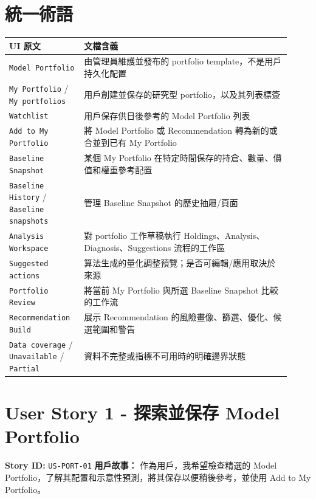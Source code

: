 \section{統一術語}
\begingroup
\small
\begin{longtable}{L{0.24\linewidth}L{0.68\linewidth}}
\toprule
\textbf{UI 原文} & \textbf{文檔含義} \\
\midrule
\texttt{Model Portfolio} & 由管理員維護並發布的 portfolio template，不是用戶持久化配置 \\
\texttt{My Portfolio} /\allowbreak{} \texttt{My portfolios} & 用戶創建並保存的研究型 portfolio，以及其列表標簽 \\
\texttt{Watchlist} & 用戶保存供日後參考的 Model Portfolio 列表 \\
\texttt{Add to My Portfolio} & 將 Model Portfolio 或 Recommendation 轉為新的或合並到已有 My Portfolio \\
\texttt{Baseline Snapshot} & 某個 My Portfolio 在特定時間保存的持倉、數量、價值和權重參考配置 \\
\texttt{Baseline History} /\allowbreak{} \texttt{Baseline snapshots} & 管理 Baseline Snapshot 的歷史抽屜/\allowbreak{}頁面 \\
\texttt{Analysis Workspace} & 對 portfolio 工作草稿執行 Holdings、Analysis、Diagnosis、Suggestions 流程的工作區 \\
\texttt{Suggested actions} & 算法生成的量化調整預覽；是否可編輯/\allowbreak{}應用取決於來源 \\
\texttt{Portfolio Review} & 將當前 My Portfolio 與所選 Baseline Snapshot 比較的工作流 \\
\texttt{Recommendation Build} & 展示 Recommendation 的風險畫像、篩選、優化、候選範圍和警告 \\
\texttt{Data coverage} /\allowbreak{} \texttt{Unavailable} /\allowbreak{} \texttt{Partial} & 資料不完整或指標不可用時的明確邊界狀態 \\
\bottomrule
\end{longtable}
\endgroup
\prdhr
\hypertarget{us-port-01}{}
\section{User Story 1 - 探索並保存 Model Portfolio}
\textbf{Story ID:} \texttt{US-PORT-01}
\textbf{用戶故事：} 作為用戶，我希望檢查精選的 Model Portfolio，了解其配置和示意性預測，將其保存以便稍後參考，並使用 Add to My Portfolio。
